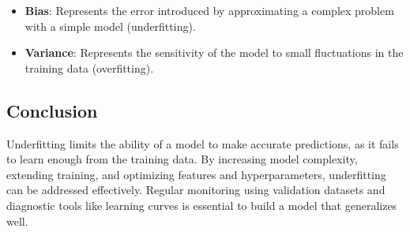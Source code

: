 \begin{itemize}
    \item \textbf{Bias}: Represents the error introduced by approximating a complex problem with a simple model (underfitting).
    \item \textbf{Variance}: Represents the sensitivity of the model to small fluctuations in the training data (overfitting).
\end{itemize}

\subsection*{Conclusion}
Underfitting limits the ability of a model to make accurate predictions, as it fails to learn enough from the training data. By increasing model complexity, extending training, and optimizing features and hyperparameters, underfitting can be addressed effectively. Regular monitoring using validation datasets and diagnostic tools like learning curves is essential to build a model that generalizes well.
